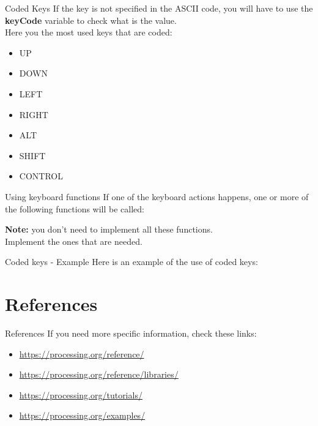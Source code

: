 \documentclass{beamer}
\begin{document}
\begin{frame}{Coded Keys}
If the key is not specified in the ASCII code, you will have to use 
the \textbf{keyCode} variable to check what is the value.\\
Here you the most used keys that are coded:\\

\begin{itemize}
\item{UP}
\item{DOWN}
\item{LEFT}
\item{RIGHT}
\item{ALT}
\item{SHIFT}
\item{CONTROL}
\end{itemize}
\end{frame}

\begin{frame}{Using keyboard functions}
If one of the keyboard actions happens, one or more of the following functions will be called:\\

\lstKeyboard

\textbf{Note: } you don't need to implement all these functions.\\
Implement the ones that are needed.
\end{frame}

\begin{frame}{Coded keys - Example}
Here is an example of the use of coded keys:\\

\lstKeyboardExample
\end{frame}

\section{References}

\begin{frame}{References}
If you need more specific information, check these links:\\

\begin{itemize}
\item{\url{https://processing.org/reference/}}
\item{\url{https://processing.org/reference/libraries/}}
\item{\url{https://processing.org/tutorials/}}
\item{\url{https://processing.org/examples/}}
\end{itemize}
\end{frame}
\end{document}

